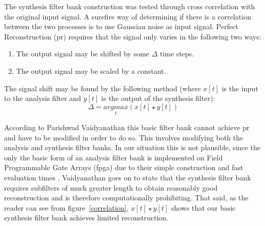 \documentclass[a4paper,10pt]{article}
\begin{document}
The synthesis filter bank construction was tested through cross correlation with the original input signal. A surefire way of determining if there is a 
correlation between the two processes is to use Gaussian noise as input signal. Perfect Reconstruction (\gls{pr}) requires that the signal only varies in the following two ways:
\begin{enumerate}
 \item The output signal may be shifted by some $\Delta$ time steps.
 \item The output signal may be scaled by a constant.
\end{enumerate}

The signal shift may be found by the following method (where $x[t]$ is the input to the analysis filter and $y[t]$ is the output of the synthesis filter):
\begin{equation}
 \Delta=\underset{t}{argmax}(x[t]\star y[t])
\end{equation}

According to Parishwad Vaidyanathan \cite{vaidyanathan1990multirate} this basic filter bank cannot achieve \gls{pr} and have to be modified in order to do so. This involves 
modifying both the analysis and synthesis filter banks. In our situation this is not plausible, since the only the basic form of an analysis filter bank is implemented 
on Field Programmable Gate Arrays (\gls{fpga}) due to their simple construction and fast evaluation times \cite{vaidyanathan1990multirate}. Vaidyanathan goes on to state 
that the synthesis filter bank requires subfilters of much greater length to obtain reasonably good reconstruction and is therefore computationally prohibiting. That said,
as the reader can see from figure~\ref{correlation}, $x[t]\star y[t]$ shows that our basic synthesis filter bank achieves limited reconstruction.
\end{document}
